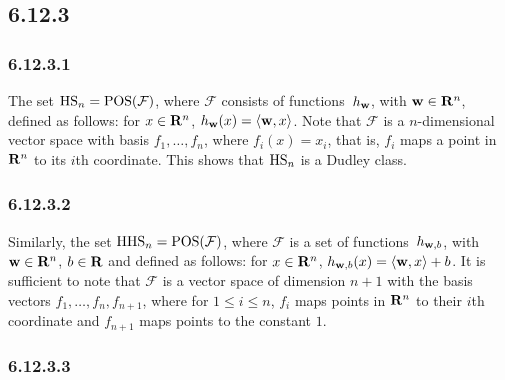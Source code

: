 \subsection*{6.12.3}

\subsubsection*{6.12.3.1}

The set $\operatorname{HS}_n = \operatorname{POS} (\mathcal{F})$, where $\mathcal{F}$ consists of
functions~$h_{\mathbf{w}}$, with $\mathbf{w} \in \mathbf{R}^n$, defined as
follows: for $x \in \mathbf{R}^n$, $h_{\mathbf{w}}(x) = \left \langle \mathbf{w}, x \right \rangle$.
Note that $\mathcal{F}$ is a $n$-dimensional
vector space with basis $f_1, \ldots, f_n$, where $f_i(x) = x_i$, that is,
$f_i$ maps a point in $\mathbf{R}^n$ to its $i$th coordinate. This shows that
$\operatorname{HS}_n$ is a Dudley class.

\subsubsection*{6.12.3.2}

Similarly, the set $\operatorname{HHS}_n = \operatorname{POS} ( \mathcal{F})$, where $\mathcal{F}$
is a set of functions~$h_{\mathbf{w}, b}$, with $\mathbf{w} \in \mathbf{R}^n$, $b \in \mathbf{R}$ and
defined as follows: for $x \in \mathbf{R}^n$, $h_{\mathbf{w}, b}(x) = \left \langle \mathbf{w}, x \right \rangle + b$.
It is sufficient to note that $\mathcal{F}$ is a vector space of dimension $n + 1$
with the basis vectors $f_1, \ldots, f_n, f_{n + 1}$, where for $1 \leq i \leq n$,
$f_i$ maps points in $\mathbf{R}^n$ to their $i$th coordinate and $f_{n + 1}$ maps points
to the constant $1$.

\subsubsection*{6.12.3.3}


